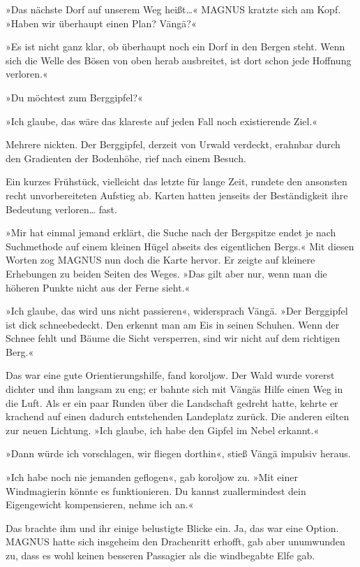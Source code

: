 »Das nächste Dorf auf unserem Weg heißt…« MAGNUS kratzte sich am Kopf. »Haben wir überhaupt einen Plan? Vängä?«

»Es ist nicht ganz klar, ob überhaupt noch ein Dorf in den Bergen steht. Wenn sich die Welle des Bösen von oben herab ausbreitet, ist dort schon jede Hoffnung verloren.«

»Du möchtest zum Berggipfel?«

»Ich glaube, das wäre das klareste auf jeden Fall noch existierende Ziel.«

Mehrere nickten. Der Berggipfel, derzeit von Urwald verdeckt, erahnbar durch den Gradienten der Bodenhöhe, rief nach einem Besuch.

Ein kurzes Frühstück, vielleicht das letzte für lange Zeit, rundete den ansonsten recht unvorbereiteten Aufstieg ab. Karten hatten jenseits der Beständigkeit ihre Bedeutung verloren… fast.

»Mir hat einmal jemand erklärt, die Suche nach der Bergspitze endet je nach Suchmethode auf einem kleinen Hügel abseits des eigentlichen Bergs.« Mit diesen Worten zog MAGNUS nun doch die Karte hervor. Er zeigte auf kleinere Erhebungen zu beiden Seiten des Weges. »Das gilt aber nur, wenn man die höheren Punkte nicht aus der Ferne sieht.«

»Ich glaube, das wird uns nicht passieren«, widersprach Vängä. »Der Berggipfel ist dick schneebedeckt. Den erkennt man am Eis in seinen Schuhen. Wenn der Schnee fehlt und Bäume die Sicht versperren, sind wir nicht auf dem richtigen Berg.«

Das war eine gute Orientierungshilfe, fand koroljow. Der Wald wurde vorerst dichter und ihm langsam zu eng; er bahnte sich mit Vängäs Hilfe einen Weg in die Luft. Als er ein paar Runden über die Landschaft gedreht hatte, kehrte er krachend auf einen dadurch entstehenden Landeplatz zurück. Die anderen eilten zur neuen Lichtung. »Ich glaube, ich habe den Gipfel im Nebel erkannt.«

»Dann würde ich vorschlagen, wir fliegen dorthin«, stieß Vängä impulsiv heraus.

»Ich habe noch nie jemanden geflogen«, gab koroljow zu. »Mit einer Windmagierin könnte es funktionieren. Du kannst zuallermindest dein Eigengewicht kompensieren, nehme ich an.«

Das brachte ihm und ihr einige belustigte Blicke ein. Ja, das war eine Option. MAGNUS hatte sich insgeheim den Drachenritt erhofft, gab aber unumwunden zu, dass es wohl keinen besseren Passagier als die windbegabte Elfe gab.

